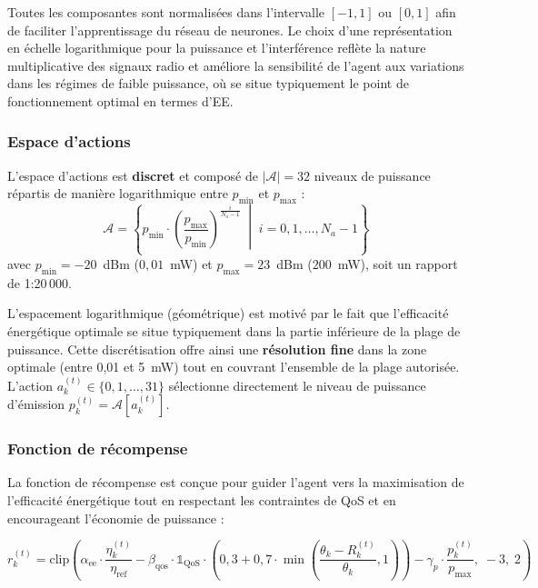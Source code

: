 \documentclass[conference]{IEEEtran}
\begin{document}
Toutes les composantes sont normalisées dans l'intervalle $[-1, 1]$ ou $[0, 1]$ afin de faciliter l'apprentissage du réseau de neurones. Le choix d'une représentation en échelle logarithmique pour la puissance et l'interférence reflète la nature multiplicative des signaux radio et améliore la sensibilité de l'agent aux variations dans les régimes de faible puissance, où se situe typiquement le point de fonctionnement optimal en termes d'EE.

\subsubsection{Espace d'actions}
\label{sec:action_space}

L'espace d'actions est \textbf{discret} et composé de $|\mathcal{A}| = 32$ niveaux de puissance répartis de manière logarithmique entre $p_{\min}$ et $p_{\max}$ :
\begin{equation}
    \mathcal{A} = \left\{ p_{\min} \cdot \left(\frac{p_{\max}}{p_{\min}}\right)^{\frac{i}{N_a - 1}} \;\middle|\; i = 0, 1, \dots, N_a - 1 \right\}
    \label{eq:action_space}
\end{equation}
avec $p_{\min} = -20$~dBm ($0{,}01$~mW) et $p_{\max} = 23$~dBm ($200$~mW), soit un rapport de 1:20\,000.

L'espacement logarithmique (géométrique) est motivé par le fait que l'efficacité énergétique optimale se situe typiquement dans la partie inférieure de la plage de puissance. Cette discrétisation offre ainsi une \textbf{résolution fine} dans la zone optimale (entre 0,01 et 5~mW) tout en couvrant l'ensemble de la plage autorisée. L'action $a_k^{(t)} \in \{0, 1, \dots, 31\}$ sélectionne directement le niveau de puissance d'émission $p_k^{(t)} = \mathcal{A}[a_k^{(t)}]$.

\subsubsection{Fonction de récompense}
\label{sec:reward}

La fonction de récompense est conçue pour guider l'agent vers la maximisation de l'efficacité énergétique tout en respectant les contraintes de QoS et en encourageant l'économie de puissance :

\begin{equation}
    r_k^{(t)} = \text{clip}\!\left(\alpha_{\text{ee}} \cdot \frac{\eta_k^{(t)}}{\eta_{\text{ref}}} - \beta_{\text{qos}} \cdot \mathbb{1}_{\text{QoS}} \cdot \left(0{,}3 + 0{,}7 \cdot \min\!\left(\frac{\theta_k - R_k^{(t)}}{\theta_k}, 1\right)\right) - \gamma_p \cdot \frac{p_k^{(t)}}{p_{\max}},\; -3,\; 2\right)
    \label{eq:reward}
\end{equation}
\end{document}

